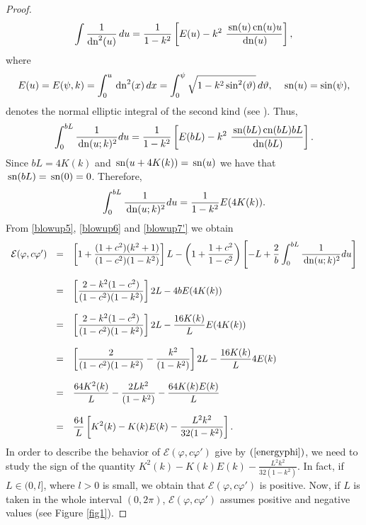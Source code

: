 \documentclass[12pt,reqno,a4paper]{amsart} %
\newcommand{\cn}{{\rm \,cn}}
\newcommand{\sn}{{\rm \,sn}}
\newcommand{\dn}{{\rm \,dn}}
\numberwithin{equation}{section}
\numberwithin{figure}{section}
\begin{document}
\begin{proof}
 	\begin{equation*}
 		\int \frac{1}{\operatorname{dn}^2( u)} \, du 
 		=  \frac{1}{1-k^2} \left[ E(u) - k^2 \,  \, \frac{\sn( u)\cn(u) u }{\dn(u)}  \right],
 	\end{equation*}
 	where $$E(u)=E(\psi, k)=\displaystyle\int_{0}^{u } \dn^2 (x) \, dx=\int_{0}^{\psi} \sqrt{1 - k^2 \sin^2 (\vartheta)} \, d\vartheta , \quad \sn (u)=\sin(\psi),$$ denotes the normal elliptic integral of the second kind (see \cite[Formula 110.03]{byrd}). Thus, 
 	\begin{align}\nonumber
 		\int_{0}^{bL} \frac{1}{ \dn (u ;k )^2}  du = \frac{1}{1-k^2} \left[ E(bL) - k^2 \,  \, \frac{\sn( bL)\cn(bL)bL}{\dn(bL)}  \right]. 
 	\end{align}Since $bL=4K(k)$ and $\sn(u+4K(k))=\sn(u)$ we have that $\sn( bL)=\sn(0)=0 $. Therefore, 	\begin{align}\label{blowup7'}
 		\int_{0}^{bL} \frac{1}{ \dn (u ;k )^2}  du = \frac{1}{1-k^2}   E(4K(k))  . 
 	\end{align}
 	From \eqref{blowup5}, \eqref{blowup6} and \eqref{blowup7'} we obtain 
 	\begin{equation}\label{energyphi}\begin{array}{lllll}
 		\mathcal{E}(\varphi, c\varphi')
 		&=& \displaystyle \left[ 1+ \frac{(1+c^2)(k^2+1)}{(1-c^2)(1-k^2)} \right] L -\left(1+\frac{1+c^2}{1-c^2}\right) \left[ -L+\frac{2}{b}	\int_{0}^{bL} \frac{1}{ \dn (u ;k )^2}  du \right ]\\\\ 
 		&= &\displaystyle \left[  \frac{2-k^2(1-c^2)}{(1-c^2)(1-k^2)} \right] 2L-4b E(4K(k)) \\\\ 
 		&= &\displaystyle \left[  \frac{2-k^2(1-c^2)}{(1-c^2)(1-k^2)} \right] 2L-\frac{16K(k)}{L} E(4K(k)) \\\\
 		&= &\displaystyle \left[  \frac{2 }{(1-c^2)(1-k^2)}-\frac{ k^2 }{ (1-k^2)} \right] 2L-\frac{16K(k)}{L} 4E(k)  \\\\ 
 		&= &\displaystyle   \frac{64K^2(k) }{L}-\frac{2L k^2 }{ (1-k^2)}   -\frac{64K(k) E(k) }{L} \\\\
 		&=& \displaystyle\frac{64}{L}\left[ K^2(k)-K(k) E(k)  -\frac{L^2 k^2 }{ 32(1-k^2)}   \right].
 \end{array}	\end{equation}
 	\indent In order to describe the behavior of $\mathcal{E}(\varphi,c\varphi')$ give by $(\ref{energyphi})$, we need to study the sign of the quantity $ \displaystyle K^2(k)-K(k) E(k)  -\frac{L^2 k^2 }{ 32(1-k^2)}$. In fact, if $L\in (0,l]$, where $l>0$ is small, we obtain that $\mathcal{E}(\varphi,c\varphi')$ is positive. Now, if $L$ is taken in the whole interval $(0,2\pi)$, $\mathcal{E}(\varphi,c\varphi')$ assumes positive and negative values (see Figure \ref{fig1}). 
 	

\end{proof}
\end{document}
